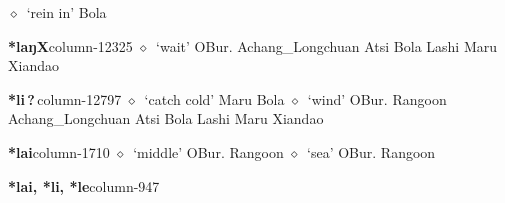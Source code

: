          $\diamond$~`rein in'
         Bola 
  \item {\footnotesize \textbf{*laŋX}}{\tiny column-12325}
         $\diamond$~`wait'
         OBur. 
\hspace{1ex}
         Achang\_Longchuan 
\hspace{1ex}
         Atsi 
\hspace{1ex}
         Bola 
\hspace{1ex}
         Lashi 
\hspace{1ex}
         Maru 
\hspace{1ex}
         Xiandao 
  \item {\footnotesize \textbf{*li\,?\,}}{\tiny column-12797}
         $\diamond$~`catch cold'
         Maru 
\hspace{1ex}
         Bola 
\hspace{1ex}
         $\diamond$~`wind'
         OBur. 
\hspace{1ex}
         Rangoon 
\hspace{1ex}
         Achang\_Longchuan 
\hspace{1ex}
         Atsi 
\hspace{1ex}
         Bola 
\hspace{1ex}
         Lashi 
\hspace{1ex}
         Maru 
\hspace{1ex}
         Xiandao 
  \item {\footnotesize \textbf{*lai}}{\tiny column-1710}
         $\diamond$~`middle'
         OBur. 
\hspace{1ex}
         Rangoon 
\hspace{1ex}
         $\diamond$~`sea'
         OBur. 
\hspace{1ex}
         Rangoon 
  \item {\footnotesize \textbf{*lai, *li, *le}}{\tiny column-947}
